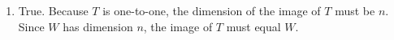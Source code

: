 \documentclass[12pt,letterpaper]{article}
\begin{document}
\begin{enumerate}
\begin{enumerate}
\item True. Because $T$ is one-to-one, the dimension of the image of $T$
must be $n$. Since $W$ has dimension $n$, the image of $T$ must equal $W$.
\end{enumerate}
        
          

\end{enumerate}  
\end{document}
